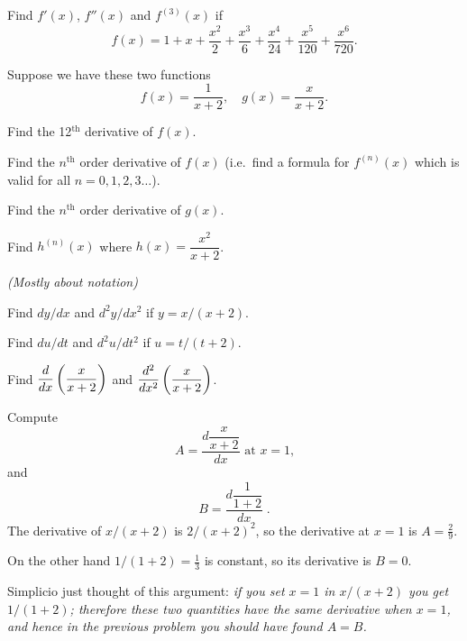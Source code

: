 \begin{multicols}{2}
\problem 
Find $f'(x)$, $f''(x)$ and $f^{(3)}(x)$ if
\[
f(x)=1+x+\frac{x^2}{2}+\frac{x^3}{6}+\frac{x^4}{24}
+\frac{x^5}{120}+\frac{x^6}{720}.
\]








\problem \groupproblem  Suppose we have these two functions 
\[
f(x)=\frac{1} {x+2},\quad
g(x)=\frac{x} {x+2}.
\]




\subprob  Find the 12$^{\text{th}}$ derivative of $f(x)$.




\subprob  Find the $n^{\text{th}}$ order derivative of
$f(x)$  (i.e.\ find a formula for $f^{(n)}(x)$
which is valid for all $n=0, 1, 2, 3\ldots$).




\subprob  Find the $n^{\text{th}}$ order derivative of
$g(x)$.




\subprob Find $h^{(n)}(x)$ where $h(x) = \dfrac{x^2} {x+2}$.
















\problem \groupproblem \textit{(Mostly about notation)} 




\subprob  Find $dy/dx$ and $d^2y/dx^2$ if $y= x/( x+2)$.  




\subprob  Find $du/dt$ and $d^2u/dt^2$ if $u= t/(t+2)$.




\subprob  Find $\displaystyle \frac{d}{dx}\left(\frac x{x+2}\right)$ and
$\displaystyle\frac{d^2}{dx^2}\left(\frac x{x+2}\right)$.  




\subprob  Compute
\[
A= \frac{d\dfrac{x} {x+2}} {dx} \text{ at $x=1$,}
\]
and
\[
B= \frac{d\dfrac{1} {1+2}} {dx}\;.
\]
\answer 
The derivative of $x/(x+2)$ is $2/(x+2)^2$, so the derivative at $x=1$ is
$A = \frac29$.




On the other hand
$1/(1+2) = \frac13$ is constant, so its derivative is $B=0$.
\endanswer




\subprob Simplicio just thought of this argument:
\textit{if you set $x=1$ in $x/(x+2)$ you get
$1/(1+2)$; therefore these two quantities have the same derivative when
$x=1$, and hence in the previous problem you should have found $A=B$. }





\end{multicols}

